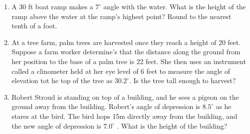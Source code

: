 \begin{enumerate}
\begin{enumerate}

\vfill

\item ~ \\

	
  
  \vfill

\end{enumerate}
\clearpage

\item A 30 ft boat ramp makes a $7^\circ$ angle with the water.  What
  is the height of the ramp above the water at the ramp's highest
  point?  Round to the nearest tenth of a foot.

  \vfill


\item At a tree farm, palm trees are harvested once they reach a
  height of 20 feet.  Suppose a farm worker determine's that the
  distance along the ground from her position to the base of a palm
  tree is 22 feet.  She then uses an instrument called a clinometer
  held at her eye level of 6 feet to measure the angle of elevation
  tot he top of the tree as $30.2^\circ$.  Is the tree tall enough to
  harvest?

  \vfill

  \clearpage

\item Robert Stroud is standing on top of a building, and he sees a
  pigeon on the ground away from the building. Robert’s angle of
  depression is $8.5^\circ$ as he stares at the bird. The bird hops
  15m directly away from the building, and the new angle of depression
  is $7.0^\circ$ .  What is the height of the building?


  \vfill

\end{enumerate}

